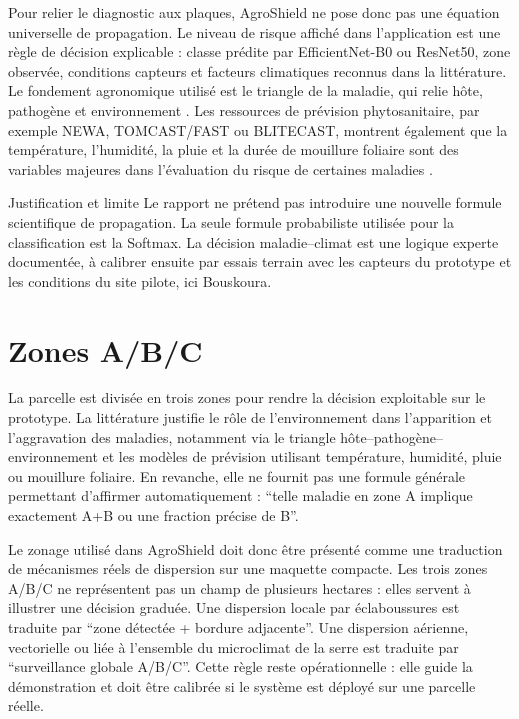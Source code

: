 ﻿\documentclass[11pt,a4paper,openany]{report}
\begin{document}
Pour relier le diagnostic aux plaques, AgroShield ne pose donc pas une équation universelle de propagation. Le niveau de risque affiché dans l'application est une règle de décision explicable : classe prédite par EfficientNet-B0 ou ResNet50, zone observée, conditions capteurs et facteurs climatiques reconnus dans la littérature. Le fondement agronomique utilisé est le triangle de la maladie, qui relie hôte, pathogène et environnement \cite{diseasetriangle}. Les ressources de prévision phytosanitaire, par exemple NEWA, TOMCAST/FAST ou BLITECAST, montrent également que la température, l'humidité, la pluie et la durée de mouillure foliaire sont des variables majeures dans l'évaluation du risque de certaines maladies \cite{newa,ucipmfast}.

\begin{importantbox}{Justification et limite}
Le rapport ne prétend pas introduire une nouvelle formule scientifique de propagation. La seule formule probabiliste utilisée pour la classification est la Softmax. La décision maladie--climat est une logique experte documentée, à calibrer ensuite par essais terrain avec les capteurs du prototype et les conditions du site pilote, ici Bouskoura.
\end{importantbox}

\section{Zones A/B/C}
La parcelle est divisée en trois zones pour rendre la décision exploitable sur le prototype. La littérature justifie le rôle de l'environnement dans l'apparition et l'aggravation des maladies, notamment via le triangle hôte--pathogène--environnement et les modèles de prévision utilisant température, humidité, pluie ou mouillure foliaire. En revanche, elle ne fournit pas une formule générale permettant d'affirmer automatiquement : ``telle maladie en zone A implique exactement A+B ou une fraction précise de B''.

Le zonage utilisé dans AgroShield doit donc être présenté comme une traduction de mécanismes réels de dispersion sur une maquette compacte. Les trois zones A/B/C ne représentent pas un champ de plusieurs hectares : elles servent à illustrer une décision graduée. Une dispersion locale par éclaboussures est traduite par ``zone détectée + bordure adjacente''. Une dispersion aérienne, vectorielle ou liée à l'ensemble du microclimat de la serre est traduite par ``surveillance globale A/B/C''. Cette règle reste opérationnelle : elle guide la démonstration et doit être calibrée si le système est déployé sur une parcelle réelle.
\end{document}
